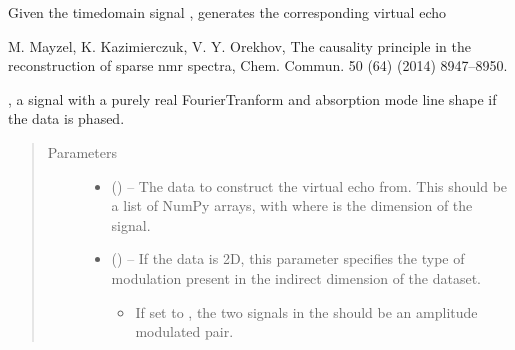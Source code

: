 \documentclass[letterpaper,10pt,english]{sphinxmanual}
\begin{document}
\begin{fulllineitems}
\label{\detokenize{references/sig:nmrespy.sig.make_virtual_echo}}
\sphinxAtStartPar
Given the time\sphinxhyphen{}domain signal , generates the corresponding
virtual echo %
\begin{footnote}[1]\sphinxAtStartFootnote
M. Mayzel, K. Kazimierczuk, V. Y. Orekhov, The causality principle
in the reconstruction of sparse nmr spectra, Chem. Commun. 50 (64)
(2014) 8947–8950.
%
\end{footnote}, a signal with a purely real Fourier\sphinxhyphen{}Tranform and
absorption mode line shape if the data is phased.
\begin{quote}\begin{description}
\item[{Parameters}] \leavevmode\begin{itemize}
\item {} 
\sphinxAtStartPar
{} (\sphinxstyleliteralemphasis{\sphinxupquote{{[}}}\sphinxstyleliteralemphasis{\sphinxupquote{{]} or }}\sphinxstyleliteralemphasis{\sphinxupquote{{[}}}\sphinxstyleliteralemphasis{\sphinxupquote{, }}\sphinxstyleliteralemphasis{\sphinxupquote{{]}}}) – The data to construct the virtual echo from. This should be a list of
NumPy arrays, with  where  is the dimension
of the signal.

\item {} 
\sphinxAtStartPar
{} (\sphinxstyleliteralemphasis{\sphinxupquote{, }}) – 
\sphinxAtStartPar
If the data is 2D, this parameter specifies the type of modulation
present in the indirect dimension of the dataset.
\begin{itemize}
\item {} 
\sphinxAtStartPar
If set to , the two signals in the  should be an
amplitude modulated pair.


\end{itemize}
\end{itemize}
\end{description}
\end{quote}
\end{fulllineitems}
\end{document}
